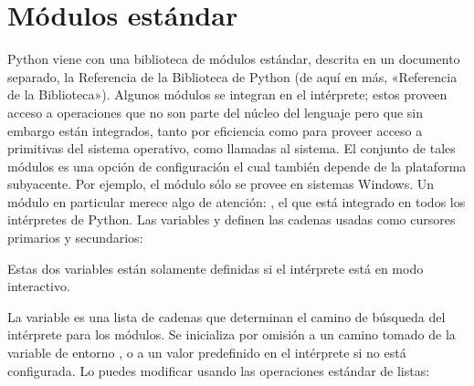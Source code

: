 \documentclass[a4,10pt,spanish]{sphinxmanual}
\begin{document}
\section{Módulos estándar}
\label{\detokenize{tutorial/modules:standard-modules}}\label{\detokenize{tutorial/modules:tut-standardmodules}}
\ignorespaces 
\sphinxAtStartPar
Python viene con una biblioteca de módulos estándar, descrita en un documento separado, la Referencia de la Biblioteca de Python (de aquí en más, «Referencia de la Biblioteca»).  Algunos módulos se integran en el intérprete; estos proveen acceso a operaciones que no son parte del núcleo del lenguaje pero que sin embargo están integrados, tanto por eficiencia como para proveer acceso a primitivas del sistema operativo, como llamadas al sistema.  El conjunto de tales módulos es una opción de configuración el cual también depende de la plataforma subyacente.  Por ejemplo, el módulo  sólo se provee en sistemas Windows.  Un módulo en particular merece algo de atención: , el que está integrado en todos los intérpretes de Python.  Las variables  y  definen las cadenas usadas como cursores primarios y secundarios:

\begin{sphinxVerbatim}[commandchars=\\\{\}]
 
  
\end{sphinxVerbatim}

\sphinxAtStartPar
Estas dos variables están solamente definidas si el intérprete está en modo interactivo.

\sphinxAtStartPar
La variable  es una lista de cadenas que determinan el camino de búsqueda del intérprete para los módulos. Se inicializa por omisión a un camino tomado de la variable de entorno , o a un valor predefinido en el intérprete si  no está configurada. Lo puedes modificar usando las operaciones estándar de listas:
\end{document}
